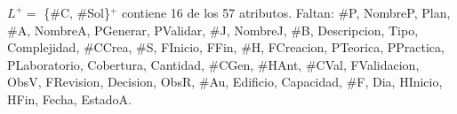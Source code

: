 $L^+ =$ \{\#C, \#Sol\}$^+$ contiene 16 de los 57 atributos. Faltan: \#P, NombreP, Plan, \#A, NombreA, PGenerar, PValidar, \#J, NombreJ, \#B, Descripcion, Tipo, Complejidad, \#CCrea, \#S, FInicio, FFin, \#H, FCreacion, PTeorica, PPractica, PLaboratorio, Cobertura, Cantidad, \#CGen, \#HAnt, \#CVal, FValidacion, ObsV, FRevision, Decision, ObsR, \#Au, Edificio, Capacidad, \#F, Dia, HInicio, HFin, Fecha, EstadoA.
